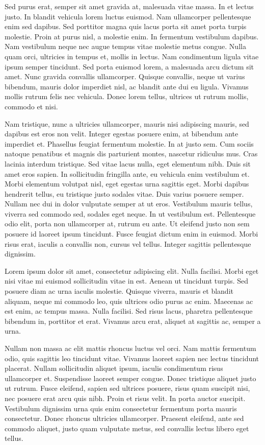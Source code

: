 Sed purus erat, semper sit amet gravida at, malesuada vitae massa. In et lectus justo. In blandit vehicula lorem luctus euismod. Nam ullamcorper pellentesque enim sed dapibus. Sed porttitor magna quis lacus porta sit amet porta turpis molestie. Proin at purus nisl, a molestie enim. In fermentum vestibulum dapibus. Nam vestibulum neque nec augue tempus vitae molestie metus congue. Nulla quam orci, ultricies in tempus et, mollis in lectus. Nam condimentum ligula vitae ipsum semper tincidunt. Sed porta euismod lorem, a malesuada arcu dictum sit amet. Nunc gravida convallis ullamcorper. Quisque convallis, neque ut varius bibendum, mauris dolor imperdiet nisl, ac blandit ante dui eu ligula. Vivamus mollis rutrum felis nec vehicula. Donec lorem tellus, ultrices ut rutrum mollis, commodo et nisi.

Nam tristique, nunc a ultricies ullamcorper, mauris nisi adipiscing mauris, sed dapibus est eros non velit. Integer egestas posuere enim, at bibendum ante imperdiet et. Phasellus feugiat fermentum molestie. In at justo sem. Cum sociis natoque penatibus et magnis dis parturient montes, nascetur ridiculus mus. Cras lacinia interdum tristique. Sed vitae lacus nulla, eget elementum nibh. Duis sit amet eros sapien. In sollicitudin fringilla ante, eu vehicula enim vestibulum et. Morbi elementum volutpat nisl, eget egestas urna sagittis eget. Morbi dapibus hendrerit tellus, eu tristique justo sodales vitae. Duis varius posuere semper. Nullam nec dui in dolor vulputate semper at ut eros. Vestibulum mauris tellus, viverra sed commodo sed, sodales eget neque. In ut vestibulum est. Pellentesque odio elit, porta non ullamcorper at, rutrum eu ante. Ut eleifend justo non sem posuere id laoreet ipsum tincidunt. Fusce feugiat dictum enim in euismod. Morbi risus erat, iaculis a convallis non, cursus vel tellus. Integer sagittis pellentesque dignissim.

Lorem ipsum dolor sit amet, consectetur adipiscing elit. Nulla facilisi. Morbi eget nisi vitae mi euismod sollicitudin vitae in est. Aenean ut tincidunt turpis. Sed posuere diam ac urna iaculis molestie. Quisque viverra, mauris et blandit aliquam, neque mi commodo leo, quis ultrices odio purus ac enim. Maecenas ac est enim, ac tempus massa. Nulla facilisi. Sed risus lacus, pharetra pellentesque bibendum in, porttitor et erat. Vivamus arcu erat, aliquet at sagittis ac, semper a urna.

Nullam non massa ac elit mattis rhoncus luctus vel orci. Nam mattis fermentum odio, quis sagittis leo tincidunt vitae. Vivamus laoreet sapien nec lectus tincidunt placerat. Nullam sollicitudin aliquet ipsum, iaculis condimentum risus ullamcorper et. Suspendisse laoreet semper congue. Donec tristique aliquet justo ut rutrum. Fusce eleifend, sapien sed ultrices posuere, risus quam suscipit nisi, nec posuere erat arcu quis nibh. Proin et risus velit. In porta auctor suscipit. Vestibulum dignissim urna quis enim consectetur fermentum porta mauris consectetur. Donec rhoncus ultricies ullamcorper. Praesent eleifend, ante sed commodo aliquet, justo quam vulputate metus, sed convallis lectus libero eget tellus.

